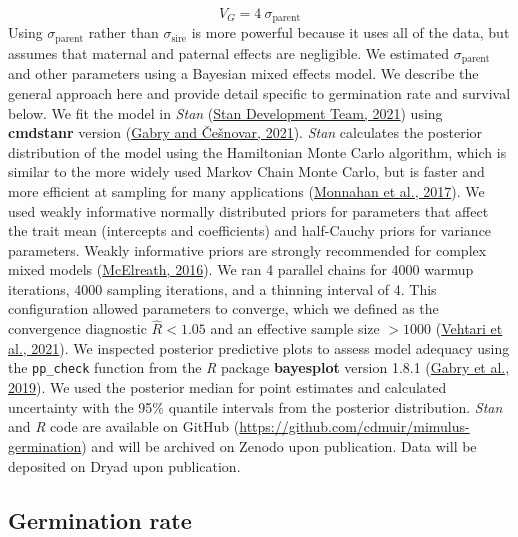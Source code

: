 \documentclass[
  12pt,
]{article}
\begin{document}
\[V_G = 4~\sigma_{\mathrm{parent}}\]
Using \(\sigma_{\mathrm{parent}}\) rather than \(\sigma_{\mathrm{sire}}\) is more powerful because it uses all of the data, but assumes that maternal and paternal effects are negligible. We estimated \(\sigma_{\mathrm{parent}}\) and other parameters using a Bayesian mixed effects model. We describe the general approach here and provide detail specific to germination rate and survival below. We fit the model in \emph{Stan} (\protect\hyperlink{ref-stan_development_team_stan_2021}{Stan Development Team, 2021}) using \textbf{cmdstanr} version (\protect\hyperlink{ref-gabry_cmdstanr_2021}{Gabry and Češnovar, 2021}). \emph{Stan} calculates the posterior distribution of the model using the Hamiltonian Monte Carlo algorithm, which is similar to the more widely used Markov Chain Monte Carlo, but is faster and more efficient at sampling for many applications (\protect\hyperlink{ref-monnahan_faster_2017}{Monnahan et al., 2017}). We used weakly informative normally distributed priors for parameters that affect the trait mean (intercepts and coefficients) and half-Cauchy priors for variance parameters. Weakly informative priors are strongly recommended for complex mixed models (\protect\hyperlink{ref-mcelreath_statistical_2016}{McElreath, 2016}). We ran 4 parallel chains for 4000 warmup iterations, 4000 sampling iterations, and a thinning interval of 4. This configuration allowed parameters to converge, which we defined as the convergence diagnostic \(\hat{R} < 1.05\) and an effective sample size \(>1000\) (\protect\hyperlink{ref-vehtari_rank-normalization_2021}{Vehtari et al., 2021}). We inspected posterior predictive plots to assess model adequacy using the \texttt{pp\_check} function from the \emph{R} package \textbf{bayesplot} version 1.8.1 (\protect\hyperlink{ref-gabry_visualization_2019}{Gabry et al., 2019}). We used the posterior median for point estimates and calculated uncertainty with the 95\% quantile intervals from the posterior distribution. \emph{Stan} and \emph{R} code are available on GitHub (\url{https://github.com/cdmuir/mimulus-germination}) and will be archived on Zenodo upon publication. Data will be deposited on Dryad upon publication.

\hypertarget{germination-rate}{%
\subsection{Germination rate}\label{germination-rate}}
\end{document}

